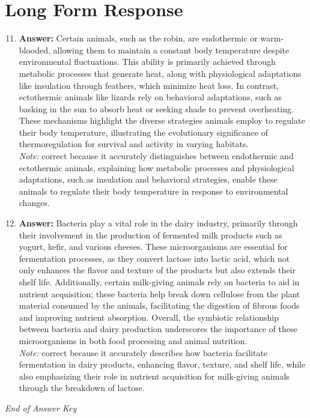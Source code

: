 \documentclass[12pt]{article}
\begin{document}
\section*{Long Form Response}
\begin{enumerate}[label=\arabic*.]
\setcounter{enumi}{10}
\item \textbf{Answer:} Certain animals, such as the robin, are endothermic or warm-blooded, allowing them to maintain a constant body temperature despite environmental fluctuations. This ability is primarily achieved through metabolic processes that generate heat, along with physiological adaptations like insulation through feathers, which minimize heat loss. In contrast, ectothermic animals like lizards rely on behavioral adaptations, such as basking in the sun to absorb heat or seeking shade to prevent overheating. These mechanisms highlight the diverse strategies animals employ to regulate their body temperature, illustrating the evolutionary significance of thermoregulation for survival and activity in varying habitats.
\\ \textit{Note:} correct because it accurately distinguishes between endothermic and ectothermic animals, explaining how metabolic processes and physiological adaptations, such as insulation and behavioral strategies, enable these animals to regulate their body temperature in response to environmental changes.
\item \textbf{Answer:} Bacteria play a vital role in the dairy industry, primarily through their involvement in the production of fermented milk products such as yogurt, kefir, and various cheeses. These microorganisms are essential for fermentation processes, as they convert lactose into lactic acid, which not only enhances the flavor and texture of the products but also extends their shelf life. Additionally, certain milk-giving animals rely on bacteria to aid in nutrient acquisition; these bacteria help break down cellulose from the plant material consumed by the animals, facilitating the digestion of fibrous foods and improving nutrient absorption. Overall, the symbiotic relationship between bacteria and dairy production underscores the importance of these microorganisms in both food processing and animal nutrition.
\\ \textit{Note:} correct because it accurately describes how bacteria facilitate fermentation in dairy products, enhancing flavor, texture, and shelf life, while also emphasizing their role in nutrient acquisition for milk-giving animals through the breakdown of lactose.
\end{enumerate}

\vfill
\noindent\textit{End of Answer Key}
\end{document}
